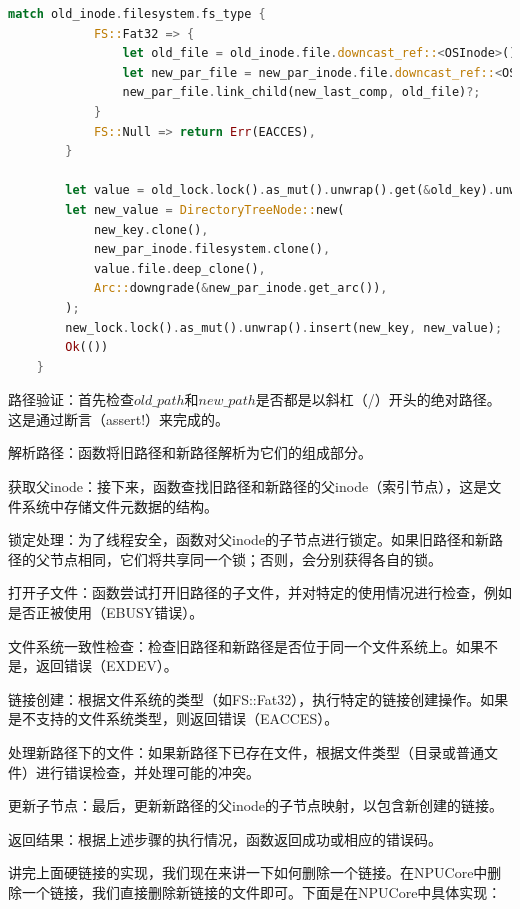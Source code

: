 \begin{lstlisting}[language=rust]
        match old_inode.filesystem.fs_type {
            FS::Fat32 => {
                let old_file = old_inode.file.downcast_ref::<OSInode>().unwrap();
                let new_par_file = new_par_inode.file.downcast_ref::<OSInode>().unwrap();
                new_par_file.link_child(new_last_comp, old_file)?;
            }
            FS::Null => return Err(EACCES),
        }

        let value = old_lock.lock().as_mut().unwrap().get(&old_key).unwrap().clone();
        let new_value = DirectoryTreeNode::new(
            new_key.clone(),
            new_par_inode.filesystem.clone(),
            value.file.deep_clone(),
            Arc::downgrade(&new_par_inode.get_arc()),
        );
        new_lock.lock().as_mut().unwrap().insert(new_key, new_value);
        Ok(())
    }
\end{lstlisting}

路径验证：首先检查$old\_path$和$new\_path$是否都是以斜杠（/）开头的绝对路径。这是通过断言（assert!）来完成的。

解析路径：函数将旧路径和新路径解析为它们的组成部分。

获取父inode：接下来，函数查找旧路径和新路径的父inode（索引节点），这是文件系统中存储文件元数据的结构。

锁定处理：为了线程安全，函数对父inode的子节点进行锁定。如果旧路径和新路径的父节点相同，它们将共享同一个锁；否则，会分别获得各自的锁。

打开子文件：函数尝试打开旧路径的子文件，并对特定的使用情况进行检查，例如是否正被使用（EBUSY错误）。

文件系统一致性检查：检查旧路径和新路径是否位于同一个文件系统上。如果不是，返回错误（EXDEV）。

链接创建：根据文件系统的类型（如FS::Fat32），执行特定的链接创建操作。如果是不支持的文件系统类型，则返回错误（EACCES）。

处理新路径下的文件：如果新路径下已存在文件，根据文件类型（目录或普通文件）进行错误检查，并处理可能的冲突。

更新子节点：最后，更新新路径的父inode的子节点映射，以包含新创建的链接。

返回结果：根据上述步骤的执行情况，函数返回成功或相应的错误码。

讲完上面硬链接的实现，我们现在来讲一下如何删除一个链接。在NPUCore中删除一个链接，我们直接删除新链接的文件即可。下面是在NPUCore中具体实现：

